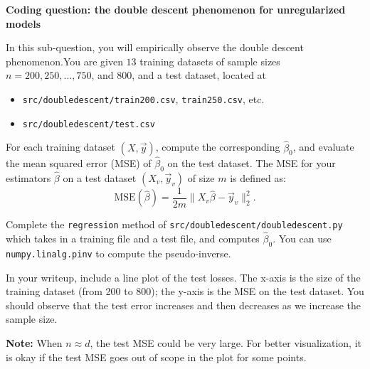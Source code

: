 \item {} \textbf{Coding question: the double descent phenomenon for unregularized models}

In this sub-question, you will empirically observe the double descent phenomenon.You are given $13$ training datasets of sample sizes $n  = 200, 250, \dots, 750$, and $800$, and a test dataset, located at
\begin{itemize}
	\item \texttt{src/doubledescent/train200.csv}, \texttt{train250.csv}, etc.
	\item \texttt{src/doubledescent/test.csv}
\end{itemize} 

For each training dataset $(X, \vec{y})$, compute the corresponding $\hat{\beta}_0$, and evaluate the mean squared error (MSE) of $\hat{\beta}_0$ on the test dataset. The MSE for your estimators $\hat{\beta}$ on a test dataset $(X_v, \vec{y}_v)$ of size $m$ is defined as: $$\text{MSE}(\hat{\beta}) = \frac{1}{2m} \|X_v \hat{\beta}-\vec{y}_v\|^2_2.$$


Complete the \texttt{regression} method of \texttt{src/doubledescent/doubledescent.py} which takes in a training file and a test file, and computes $\hat{\beta}_0$. You can use \texttt{numpy.linalg.pinv} to compute the pseudo-inverse.

In your writeup, include a line plot of the test losses. The x-axis is the size of the training dataset (from 200 to 800); the y-axis is the MSE on the test dataset. You should observe that the test error increases and then decreases as we increase the sample size.  

\textbf{Note:} When $n\approx d$, the test MSE could be very large. For better visualization, it is okay if the test MSE goes out of scope in the plot for some points.